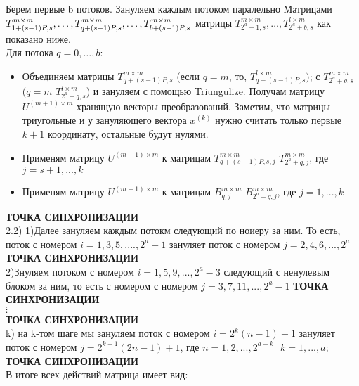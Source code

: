 \documentclass[a4paper,12pt]{article}
\begin{document}
Берем первые b потоков. Зануляем каждым потоком паралельно Матрицами $\\ T_{1 + (s-1)P,s}^{m \times m}, \dots, T_{q + (s-1)P,s}^{m \times m},\dots ,T_{b + (s-1)P,s}^{m \times m}\\$ матрицы $T_{2^{a} +1,s}^{m \times m}, \dots , T_{2^{a} +b,s}^{l \times m}$ как показано ниже.\\ 
Для потока $q = 0, \dots,b$: 
\begin{itemize}
    \item Объединяем матрицы $T_{q + (s-1)P,s}^{m \times m}$ (если $q = m$, то, $T_{q + (s-1)P,s}^{l \times m})$; с $T_{2^{a} +q,s}^{m \times m}$ ($q = m$ $T_{2^{a} +q,s}^{l \times m}$) и зануляем с помощью Triungulize. Получам матрицу $U^{(m+1) \times m}$ хранящую векторы преобразований. Заметим, что матрицы триугольные и у зануляющего вектора $x^{(k)}$ нужно считать только первые $k+1$ координату, остальные будут нулями.
    \item Применям матрицу $U^{(m+1) \times m}$ к матрицам  $T_{q + (s-1)P,s,j}^{m \times m}$ $T_{2^{a} +q,j} ^{m \times m}$, где $j = s+1,...,k$
    \item Применям матрицу $U^{(m+1) \times m}$ к матрицам  $B_{q,j}^{m \times m}$ $B_{2^{a} +q,j} ^{m \times m}$, где $j = 1,...,k$
\end{itemize}
\textbf{ ТОЧКА СИНХРОНИЗАЦИИ}\\
2.2) 1)Далее зануляем каждым потокм следующий по ноиеру за ним. То есть, поток с номером $i= 1,3,5,....,2^{a}-1$ зануляет поток с номером $j = 2,4,6,...,2^{a}$ 
\textbf{ ТОЧКА СИНХРОНИЗАЦИИ}\\
2)Знуляем потоком с номером $i = 1,5,9,...,2^{a}-3$ следующий с ненулевым блоком за ним, то есть с номером с номером $j = 3,7,11,...,2^{a}-1$
\textbf{ТОЧКА СИНХРОНИЗАЦИИ}\\
$\vdots$\\
\textbf{ТОЧКА СИНХРОНИЗАЦИИ}\\
k) на k-том шаге мы зануляем поток с номером $i = 2^{k}(n-1)+1$ зануляет поток с номером $j = 2^{k-1}(2n-1)+1$, где $n = 1,2,...,2^{a-k} \ \ \ k = 1,...,a;$
\textbf{ТОЧКА СИНХРОНИЗАЦИИ}\\
В итоге всех действий матрица имеет вид:
\end{document}
